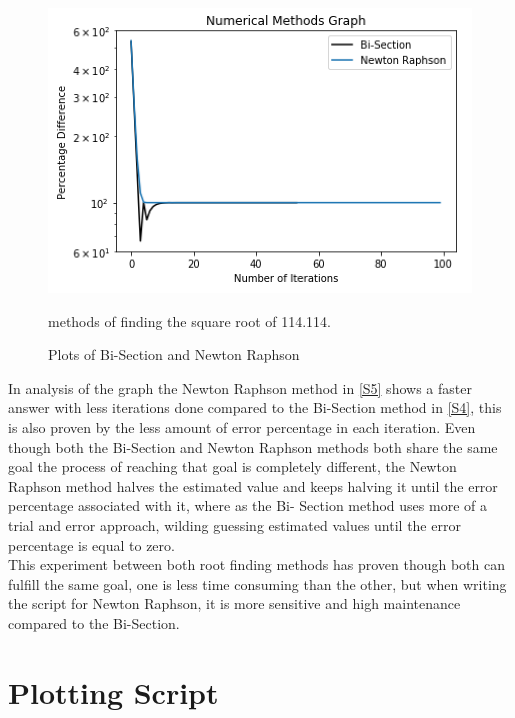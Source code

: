 \documentclass[12pt]{article}
\begin{document}
\begin{figure}[h]
\centering
\includegraphics[scale=0.8]{Numerical_Methods_Graph.png}
\caption{Plots of Bi-Section and Newton Raphson} {methods of finding the square root of 114.114.}
\label{Numerical Methods Graph}
\end{figure}

In analysis of the graph the Newton Raphson method in \cref{S5} shows 
a faster answer with less iterations done compared to the Bi-Section method in \cref{S4}, this is also proven by the less amount of error percentage in each iteration. Even though both the Bi-Section and Newton Raphson methods both share the same goal the process of reaching that goal is completely different, the Newton Raphson method halves the estimated value and keeps halving it until the error percentage associated with it, where as the Bi- Section method uses more of a trial and error approach, wilding guessing estimated values until the error percentage is equal to zero. \\

This experiment between both root finding methods has proven though both can fulfill the same goal, one is less time consuming than the other, but when writing the script for Newton Raphson, it is more sensitive and high maintenance compared to the Bi-Section. 



\section{Plotting Script}
\label{S3}
\end{document}
